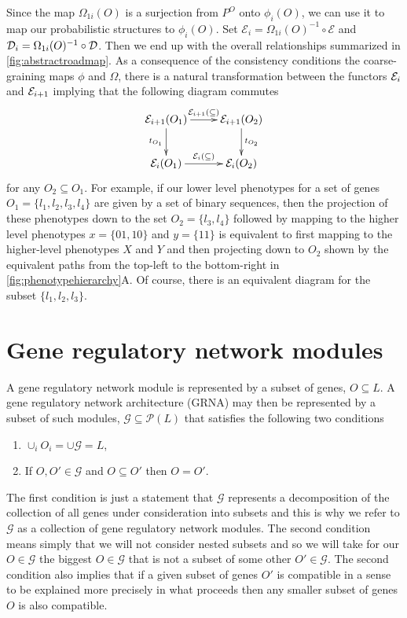 Since the map $\Omega_{1i}(O)$ is a surjection from $P^O$ onto $\phi_i(O)$, we can use it to map our probabilistic structures to $\phi_i(O)$.  Set $\mathcal{E}_i = \Omega_{1i}(O)^{-1} \circ \mathcal{E}$ and $\mathcal{D}_i = \Omega_{1i}(O)^{-1} \circ \mathcal{D}$.  Then we end up with the overall relationships summarized in \ref{fig:abstractroadmap}. As a consequence of the consistency conditions the coarse-graining maps $\phi$ and $\Omega$, there is a natural transformation between the functors $\mathcal{E}_i$ and $\mathcal{E}_{i+1}$ implying that the following diagram commutes
$$
\xymatrix{
\expr_{i+1}(O_1) \ar[r]^{\expr_{i+1}(\subseteq)} \ar[d]_{t_{O_1}} & \expr_{i+1}(O_2) \ar[d]^{t_{O_2}} \\
\expr_{i}(O_1) \ar[r]^{\expr_{i}(\subseteq)} & \expr_{i}(O_2) }
$$
for any $O_2 \subseteq O_1$. For example, if our lower level phenotypes for a set of genes $O_1 = \{ l_1,l_2,l_3,l_4 \}$ are given by a set of binary sequences, then the projection of these phenotypes down to the set $O_2 = \{l_3,l_4\}$ followed by mapping to the higher level phenotypes $x=\{01,10\}$ and $y=\{11\}$ is equivalent to first mapping to the higher-level phenotypes $X$ and $Y$ and then projecting down to $O_2$ shown by the equivalent paths from the top-left to the bottom-right in \ref{fig:phenotypehierarchy}A.
Of course, there is an equivalent diagram for the subset $\{ l_1,l_2,l_3 \}$.
\section{Gene regulatory network modules}\label{sec:covergenotypespace}
A gene regulatory network module is represented by a subset of genes, $O \subseteq L$. A gene regulatory network architecture (GRNA) may then be represented by a subset of such modules, $\mathcal{G} \subseteq \mathcal{P}(L)$ that satisfies the following two conditions
\begin{enumerate}
\item $\cup_i O_i = \cup \mathcal{G} = L$,
\item If $O,O' \in \mathcal{G}$ and $O \subseteq O'$ then $O = O'$.
\end{enumerate}
The first condition is just a statement that $\mathcal{G}$ represents a decomposition of the collection of all genes under consideration into subsets and this is why we refer to $\mathcal{G}$ as a collection of gene regulatory network modules. The second condition means simply that we will not consider nested subsets and so we will take for our $O \in \mathcal{G}$ the biggest $O \in \mathcal{G}$ that is not a subset of some other $O' \in \mathcal{G}$. The second condition also implies that if a given subset of genes $O'$ is compatible in a sense to be explained more precisely in what proceeds then any smaller subset of genes $O$ is also compatible.

